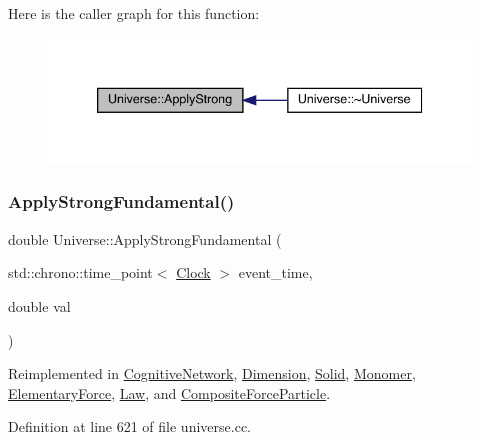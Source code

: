 Here is the caller graph for this function\+:
\nopagebreak
\begin{figure}[H]
\begin{center}
\leavevmode
\includegraphics[width=339pt]{class_universe_a906a88b37f10bfa630bef49dfd0e907a_icgraph}
\end{center}
\end{figure}
\mbox{\label{class_universe_a62789bcff84bd750b0366004381e2fdd}} 
\subsubsection{\texorpdfstring{Apply\+Strong\+Fundamental()}{ApplyStrongFundamental()}}
{\footnotesize\ttfamily double Universe\+::\+Apply\+Strong\+Fundamental (\begin{DoxyParamCaption}\item[{std\+::chrono\+::time\+\_\+point$<$ \hyperlink{universe_8h_a0ef8d951d1ca5ab3cfaf7ab4c7a6fd80}{Clock} $>$}]{event\+\_\+time,  }\item[{double}]{val }\end{DoxyParamCaption})\hspace{0.3cm}{\ttfamily [virtual]}}



Reimplemented in \hyperlink{class_cognitive_network_af25bbd4f4d8f370cd2a48fd6db8302b9}{Cognitive\+Network}, \hyperlink{class_dimension_afb01fb9e469da18899d4b14e5f095ece}{Dimension}, \hyperlink{class_solid_abd8fff76385306f97aa65dfd6b867fc6}{Solid}, \hyperlink{class_monomer_aa186454670f7796e196509238d419a35}{Monomer}, \hyperlink{class_elementary_force_a80f1977e777aa0c8cce2124b666e6446}{Elementary\+Force}, \hyperlink{class_law_a57d05f26e1c0ee953260ebd3780248f8}{Law}, and \hyperlink{class_composite_force_particle_a64fe19ee12d6ca0a69f650faa5bedb58}{Composite\+Force\+Particle}.



Definition at line 621 of file universe.\+cc.

